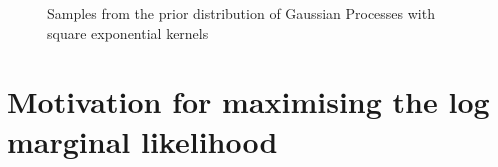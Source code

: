 \documentclass{article}
\begin{document}

\begin{figure}[ht]
    \centering
    \caption{Samples from the prior distribution of Gaussian Processes with square exponential kernels}
    \label{fig:prior_samples}
\end{figure}


\section{Motivation for maximising the log marginal likelihood}\label{appendix:why_lml}




\end{document}
